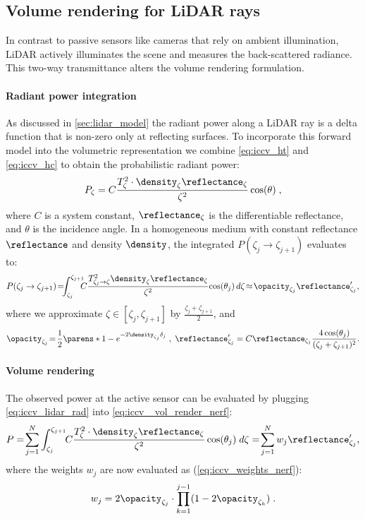\subsection{Volume rendering for LiDAR rays}
\label{sec:lidar_vr}
In contrast to passive sensors like cameras that rely on ambient illumination, LiDAR actively illuminates the scene and measures the back-scattered radiance. This two-way transmittance alters the volume rendering formulation. %

\paragraph{Radiant power integration}
As discussed in \cref{sec:lidar_model} 
the radiant power along a LiDAR ray is a delta function that is non-zero only at reflecting surfaces. To incorporate this forward model into the volumetric representation we combine \cref{eq:iccv_ht} and \cref{eq:iccv_hc} to obtain the 
probabilistic radiant power:
\begin{equation}
P_\zeta = C \frac{T^2_{\zeta} \cdot \density_\zeta  \reflectance_\zeta}{\zeta^2} \cos(\theta)\;,
\label{eq:iccv_radiance}
\end{equation}
where $C$ is a system constant, $\reflectance_\zeta$ is the differentiable reflectance, and $\theta$ is the incidence angle.
In a homogeneous medium with constant reflectance $\reflectance$ and density $\density$, the integrated $P(\zeta_j \rightarrow \zeta_{j+1})$ evaluates to:
\begin{equation}
     P(\zeta_j \rightarrow \zeta_{j+1}) 
     \!=\!\!\!\int_{\zeta_j}^{\zeta_{j+1}}\!\!\!\!C \frac{T^2_{\zeta_j \rightarrow \zeta} \density_\zeta \reflectance_\zeta}{\zeta^2}\!\cos(\theta_{j})\,d\zeta
     \!\approx\!\opacity_{\zeta_j} \reflectance_{\zeta_j}', 
\label{eq:iccv_lidar_rad}
\end{equation}
where we approximate $\zeta \in [\zeta_j, \zeta_{j+1}]$ by $\frac{\zeta_j + \zeta_{j+1}}{2}$, and 
\begin{equation}
    \opacity_{\zeta_j}\!=\!\frac{1}{2}\parens*{1- e^{-2\density_{\zeta_j}\delta_j}}\;,\; \reflectance_{\zeta_j}' = C \reflectance_{\zeta_j}\frac{4 \cos(\theta_j)}{(\zeta_j + \zeta_{j+1})^2}.
\end{equation}


\paragraph{Volume rendering}
The observed power at the active sensor can be evaluated by plugging \cref{eq:iccv_lidar_rad} into \cref{eq:iccv_ vol_render_nerf}: 
\begin{equation}
      P
      =\!\sum_{j=1}^N \int_{\zeta_j}^{\zeta_{j+1}}\!\!C \frac{T^2_{\zeta} \cdot \density_\zeta \reflectance_\zeta}{\zeta^2} \cos(\theta_j) \; d\zeta
      =\!\sum_{j=1}^N w_j \reflectance_{\zeta_j}',
\end{equation}
where the weights $w_j$ are now evaluated as (\cf \cref{eq:iccv_weights_nerf}):
\begin{equation}
   w_j = 2 \opacity_{\zeta_j} \cdot\prod_{k=1}^{j-1}(1 - 2 \opacity_{\zeta_k})\;.
\label{eq:iccv_lidar_weights}
\end{equation}